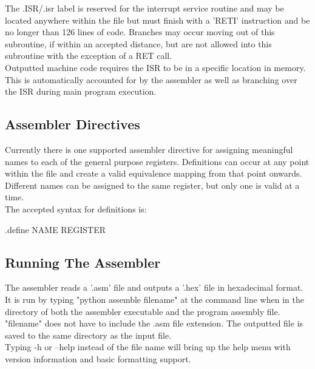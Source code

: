 \noindent The .ISR/.isr label is reserved for the interrupt service routine and may be located anywhere within the file but must finish with a 'RETI' instruction and be no longer than 126 lines of code. Branches may occur moving out of this subroutine, if within an accepted distance, but are not allowed into this subroutine with the exception of a RET call. \\

\noindent Outputted machine code requires the ISR to be in a specific location in memory. This is automatically accounted for by the assembler as well as branching over the ISR during main program execution.

\subsection{Assembler Directives}
Currently there is one supported assembler directive for assigning meaningful names to each of the general purpose registers. Definitions can occur at any point within the file and create a valid equivalence mapping from that point onwards. Different names can be assigned to the same register, but only one is valid at a time. \\

\noindent The accepted syntax for definitions is:

\begin{center}.define NAME REGISTER\end{center}

\subsection{Running The Assembler}
The assembler reads a '.asm' file and outputs a '.hex' file in hexadecimal format. It is run by typing "python assemble filename" at the command line when in the directory of both the assembler executable and the program assembly file. "filename" does not have to include the .asm file extension. The outputted file is saved to the same directory as the input file. \\

\noindent Typing -h or --help instead of the file name will bring up the help menu with version information and basic formatting support. 

\newpage
